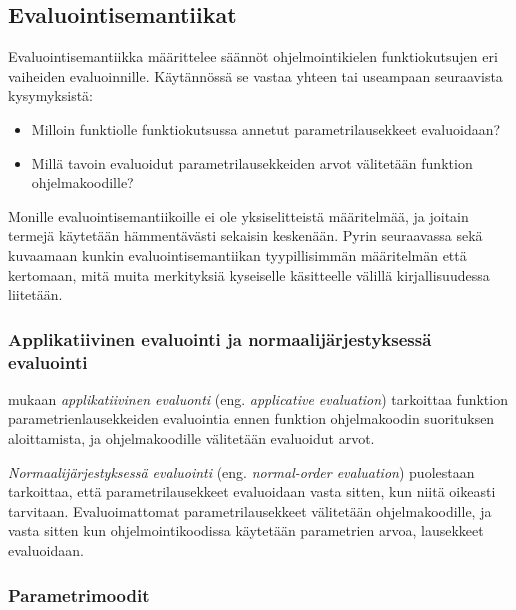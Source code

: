 \subsection{Evaluointisemantiikat}

Evaluointisemantiikka määrittelee säännöt ohjelmointikielen funktiokutsujen eri vaiheiden evaluoinnille. Käytännössä se vastaa yhteen tai useampaan seuraavista kysymyksistä:

\begin{itemize}
    \item Milloin funktiolle funktiokutsussa annetut parametrilausekkeet evaluoidaan?
    \item Millä tavoin evaluoidut parametrilausekkeiden arvot välitetään funktion ohjelmakoodille?
\end{itemize}

Monille evaluointisemantiikoille ei ole yksiselitteistä määritelmää, ja joitain termejä käytetään hämmentävästi sekaisin keskenään. Pyrin seuraavassa sekä kuvaamaan kunkin evaluointisemantiikan tyypillisimmän määritelmän että kertomaan, mitä muita merkityksiä kyseiselle käsitteelle välillä kirjallisuudessa liitetään.

\subsubsection{Applikatiivinen evaluointi ja normaalijärjestyksessä evaluointi}

\citet{scott2009programming} mukaan \textit{applikatiivinen evaluonti} (eng. \textit{applicative evaluation}) tarkoittaa funktion parametrienlausekkeiden evaluointia ennen funktion ohjelmakoodin suorituksen aloittamista, ja ohjelmakoodille välitetään evaluoidut arvot.

\textit{Normaalijärjestyksessä evaluointi} (eng. \textit{normal-order evaluation}) puolestaan tarkoittaa, että parametrilausekkeet evaluoidaan vasta sitten, kun niitä oikeasti tarvitaan. Evaluoimattomat parametrilausekkeet välitetään ohjelmakoodille, ja vasta sitten kun ohjelmointikoodissa käytetään parametrien arvoa, lausekkeet evaluoidaan.

\subsubsection{Parametrimoodit}

